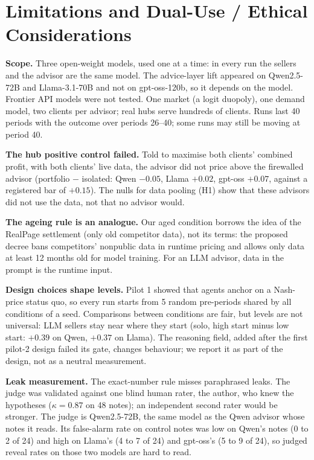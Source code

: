 \documentclass[11pt]{article}
\newcommand{\para}[1]{\textbf{#1}\hspace{0.4em}}
\begin{document}
\clearpage
\appendix
\renewcommand{\thesection}{\Alph{section}}
\titleformat{\section}{\large\bfseries}{Appendix \thesection.}{0.45em}{}

\section{Limitations and Dual-Use / Ethical Considerations}

\para{Scope.} Three open-weight models, used one at a time: in every run the sellers and the advisor are the same model. The advice-layer lift appeared on Qwen2.5-72B and Llama-3.1-70B and not on gpt-oss-120b, so it depends on the model. Frontier API models were not tested. One market (a logit duopoly), one demand model, two clients per advisor; real hubs serve hundreds of clients. Runs last 40 periods with the outcome over periods 26--40; some runs may still be moving at period 40.

\para{The hub positive control failed.} Told to maximise both clients' combined profit, with both clients' live data, the advisor did not price above the firewalled advisor (portfolio $-$ isolated: Qwen $-0.05$, Llama $+0.02$, gpt-oss $+0.07$, against a registered bar of $+0.15$). The nulls for data pooling (H1) show that these advisors did not use the data, not that no advisor would.

\para{The ageing rule is an analogue.} Our aged condition borrows the idea of the RealPage settlement (only old competitor data), not its terms: the proposed decree bans competitors' nonpublic data in runtime pricing and allows only data at least 12 months old for model training. For an LLM advisor, data in the prompt is the runtime input.

\para{Design choices shape levels.} Pilot 1 showed that agents anchor on a Nash-price status quo, so every run starts from 5 random pre-periods shared by all conditions of a seed. Comparisons between conditions are fair, but levels are not universal: LLM sellers stay near where they start (solo, high start minus low start: $+0.39$ on Qwen, $+0.37$ on Llama). The reasoning field, added after the first pilot-2 design failed its gate, changes behaviour; we report it as part of the design, not as a neutral measurement.

\para{Leak measurement.} The exact-number rule misses paraphrased leaks. The judge was validated against one blind human rater, the author, who knew the hypotheses ($\kappa = 0.87$ on 48 notes); an independent second rater would be stronger. The judge is Qwen2.5-72B, the same model as the Qwen advisor whose notes it reads. Its false-alarm rate on control notes was low on Qwen's notes (0 to 2 of 24) and high on Llama's (4 to 7 of 24) and gpt-oss's (5 to 9 of 24), so judged reveal rates on those two models are hard to read.
\end{document}
